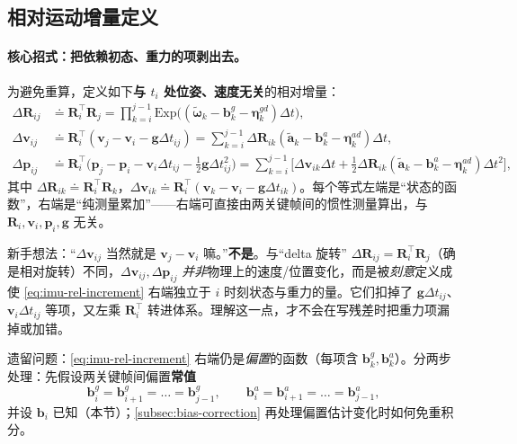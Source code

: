 \subsection{相对运动增量定义}
\label{subsec:rel-increment}

\paragraph{核心招式：把依赖初态、重力的项剥出去。}
为避免重算，定义如下\textbf{与 $t_i$ 处位姿、速度无关}的相对增量\cite{forster2017preintegration,carlone2026handbook}：
\begin{align}
  \Delta\mathbf R_{ij}&\doteq\mathbf R_i^\top\mathbf R_j=\prod_{k=i}^{j-1}\mathrm{Exp}\!\big((\tilde{\boldsymbol\omega}_k-\mathbf b_k^g-\boldsymbol\eta_k^{gd})\Delta t\big),\nonumber\\
  \Delta\mathbf v_{ij}&\doteq\mathbf R_i^\top(\mathbf v_j-\mathbf v_i-\mathbf g\Delta t_{ij})=\sum_{k=i}^{j-1}\Delta\mathbf R_{ik}(\tilde{\mathbf a}_k-\mathbf b_k^a-\boldsymbol\eta_k^{ad})\Delta t,\label{eq:imu-rel-increment}\\
  \Delta\mathbf p_{ij}&\doteq\mathbf R_i^\top\Big(\mathbf p_j-\mathbf p_i-\mathbf v_i\Delta t_{ij}-\tfrac12\mathbf g\Delta t_{ij}^2\Big)=\sum_{k=i}^{j-1}\Big[\Delta\mathbf v_{ik}\Delta t+\tfrac12\Delta\mathbf R_{ik}(\tilde{\mathbf a}_k-\mathbf b_k^a-\boldsymbol\eta_k^{ad})\Delta t^2\Big],\nonumber
\end{align}
其中 $\Delta\mathbf R_{ik}\doteq\mathbf R_i^\top\mathbf R_k$，$\Delta\mathbf v_{ik}\doteq\mathbf R_i^\top(\mathbf v_k-\mathbf v_i-\mathbf g\Delta t_{ik})$。每个等式左端是“状态的函数”，右端是“纯测量累加”——右端可直接由两关键帧间的惯性测量算出，与 $\mathbf R_i,\mathbf v_i,\mathbf p_i,\mathbf g$ 无关。

\begin{pitfall}
新手想法：“$\Delta\mathbf v_{ij}$ 当然就是 $\mathbf v_j-\mathbf v_i$ 嘛。”\textbf{不是}。与“delta 旋转” $\Delta\mathbf R_{ij}=\mathbf R_i^\top\mathbf R_j$（确是相对旋转）不同，$\Delta\mathbf v_{ij},\Delta\mathbf p_{ij}$ \emph{并非}物理上的速度/位置变化，而是被\emph{刻意}定义成使 \cref{eq:imu-rel-increment} 右端独立于 $i$ 时刻状态与重力的量\cite{forster2017preintegration}。它们扣掉了 $\mathbf g\Delta t_{ij}$、$\mathbf v_i\Delta t_{ij}$ 等项，又左乘 $\mathbf R_i^\top$ 转进体系。理解这一点，才不会在写残差时把重力项漏掉或加错。
\end{pitfall}

遗留问题：\cref{eq:imu-rel-increment} 右端仍是\emph{偏置}的函数（每项含 $\mathbf b_k^g,\mathbf b_k^a$）。分两步处理：先假设两关键帧间偏置\textbf{常值}
\begin{equation}
  \mathbf b_i^g=\mathbf b_{i+1}^g=\dots=\mathbf b_{j-1}^g,\qquad \mathbf b_i^a=\mathbf b_{i+1}^a=\dots=\mathbf b_{j-1}^a,
  \label{eq:bias-const}
\end{equation}
并设 $\mathbf b_i$ 已知（本节）；\cref{subsec:bias-correction} 再处理偏置估计变化时如何免重积分。

